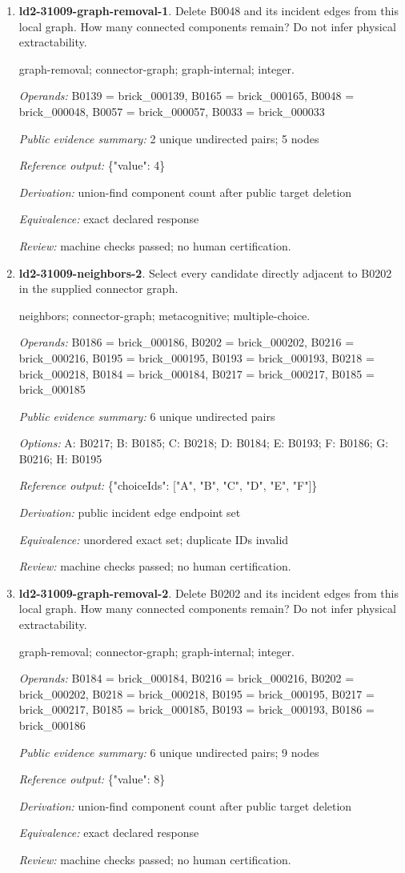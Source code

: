 \begin{enumerate}
\item \textbf{ld2-31009-graph-removal-1}. Delete B0048 and its incident edges from this local graph. How many connected components remain? Do not infer physical extractability.
\par{\small graph-removal; connector-graph; graph-internal; integer.\par\textit{Operands:} B0139 = brick\_000139, B0165 = brick\_000165, B0048 = brick\_000048, B0057 = brick\_000057, B0033 = brick\_000033\par\textit{Public evidence summary:} 2 unique undirected pairs; 5 nodes\par\textit{Reference output:} \{"value": 4\}\par\textit{Derivation:} union-find component count after public target deletion\par\textit{Equivalence:} exact declared response\par\textit{Review:} machine checks passed; no human certification.}
\item \textbf{ld2-31009-neighbors-2}. Select every candidate directly adjacent to B0202 in the supplied connector graph.
\par{\small neighbors; connector-graph; metacognitive; multiple-choice.\par\textit{Operands:} B0186 = brick\_000186, B0202 = brick\_000202, B0216 = brick\_000216, B0195 = brick\_000195, B0193 = brick\_000193, B0218 = brick\_000218, B0184 = brick\_000184, B0217 = brick\_000217, B0185 = brick\_000185\par\textit{Public evidence summary:} 6 unique undirected pairs\par\textit{Options:} A: B0217; B: B0185; C: B0218; D: B0184; E: B0193; F: B0186; G: B0216; H: B0195\par\textit{Reference output:} \{"choiceIds": ["A", "B", "C", "D", "E", "F"]\}\par\textit{Derivation:} public incident edge endpoint set\par\textit{Equivalence:} unordered exact set; duplicate IDs invalid\par\textit{Review:} machine checks passed; no human certification.}
\item \textbf{ld2-31009-graph-removal-2}. Delete B0202 and its incident edges from this local graph. How many connected components remain? Do not infer physical extractability.
\par{\small graph-removal; connector-graph; graph-internal; integer.\par\textit{Operands:} B0184 = brick\_000184, B0216 = brick\_000216, B0202 = brick\_000202, B0218 = brick\_000218, B0195 = brick\_000195, B0217 = brick\_000217, B0185 = brick\_000185, B0193 = brick\_000193, B0186 = brick\_000186\par\textit{Public evidence summary:} 6 unique undirected pairs; 9 nodes\par\textit{Reference output:} \{"value": 8\}\par\textit{Derivation:} union-find component count after public target deletion\par\textit{Equivalence:} exact declared response\par\textit{Review:} machine checks passed; no human certification.}

\end{enumerate}

